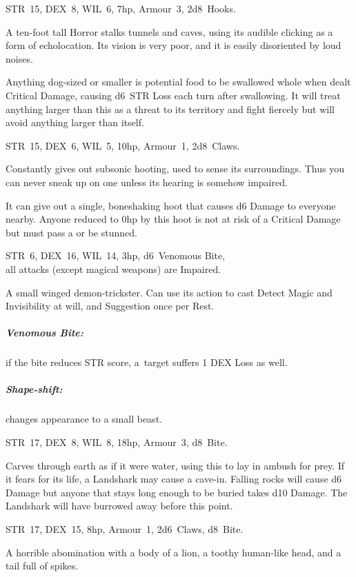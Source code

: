 \documentclass[itdr]{subfiles}
\begin{document}
\vfill

STR~15, DEX~8, WIL~6, 7hp, Armour~3, 2d8~Hooks.

A ten-foot tall Horror stalks tunnels and caves, using its audible clicking as a form of echolocation. Its vision is very poor, and it is easily disoriented by loud noises.

Anything dog-sized or smaller is potential food to be swallowed whole when dealt Critical Damage, causing d6~STR Loss each turn after swallowing. It will treat anything larger than this as a threat to its territory and fight fiercely but will avoid anything larger than itself.

\vfill

STR~15, DEX~6, WIL~5, 10hp, Armour~1, 2d8~Claws.

Constantly gives out subsonic hooting, used to sense its surroundings. Thus you can never sneak up on one unless its hearing is somehow impaired.

It can give out a single, boneshaking hoot that causes d6 Damage to everyone nearby. Anyone reduced to 0hp by this hoot is not at risk of a Critical Damage but must pass a  or be stunned.

\vfill

STR~6, DEX~16, WIL~14, 3hp, d6~Venomous Bite,\\all attacks (except magical weapons) are Impaired.

A small winged demon-trickster. Can use its action to cast Detect Magic and Invisibility at will, and Suggestion once per Rest.

\subparagraph{Venomous Bite:} if the bite reduces STR score, \mbox{a target} suffers 1 DEX Loss as well.

\subparagraph{Shape-shift:} changes appearance to a small beast.

\vfill
\break

STR~17, DEX~8, WIL~8, 18hp, Armour~3, d8~Bite.

Carves through earth as if it were water, using this to lay in ambush for prey. If it fears for its life, a Landshark may cause a cave-in. Falling rocks will cause d6 Damage but anyone that stays long enough to be buried takes d10 Damage. The Landshark will have burrowed away before this point.

\vfill

STR~17, DEX~15, 8hp, Armour~1, 2d6~Claws, d8~Bite.

A horrible abomination with a body of a lion, a toothy human-like head, and a tail full of spikes.
\end{document}
